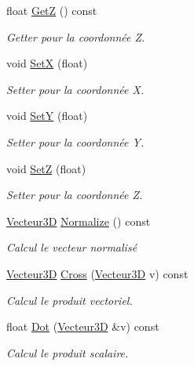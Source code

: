 \begin{DoxyCompactItemize}
float \hyperlink{class_vecteur3_d_a001bd37a2d98c071b59d168057735eeb}{Get\+Z} () const 
\begin{DoxyCompactList}\small\item\em Getter pour la coordonnée Z. \end{DoxyCompactList}\item 
void \hyperlink{class_vecteur3_d_a9e987e98ee43903a5281752bd310a764}{Set\+X} (float)
\begin{DoxyCompactList}\small\item\em Setter pour la coordonnée X. \end{DoxyCompactList}\item 
void \hyperlink{class_vecteur3_d_aaef5dfb35864a47ac7eb986cead20c71}{Set\+Y} (float)
\begin{DoxyCompactList}\small\item\em Setter pour la coordonnée Y. \end{DoxyCompactList}\item 
void \hyperlink{class_vecteur3_d_a0b20935a9e30452ea51da98fc8878181}{Set\+Z} (float)
\begin{DoxyCompactList}\small\item\em Setter pour la coordonnée Z. \end{DoxyCompactList}\item 
\hyperlink{class_vecteur3_d}{Vecteur3\+D} \hyperlink{class_vecteur3_d_a3da112b573b37eb696dd17c7f3a4230f}{Normalize} () const 
\begin{DoxyCompactList}\small\item\em Calcul le vecteur normalisé \end{DoxyCompactList}\item 
\hyperlink{class_vecteur3_d}{Vecteur3\+D} \hyperlink{class_vecteur3_d_a7050066f71a250c11b81e58e1466b389}{Cross} (\hyperlink{class_vecteur3_d}{Vecteur3\+D} v) const 
\begin{DoxyCompactList}\small\item\em Calcul le produit vectoriel. \end{DoxyCompactList}\item 
float \hyperlink{class_vecteur3_d_aa428d49b67ee120ae871cec35fd43805}{Dot} (\hyperlink{class_vecteur3_d}{Vecteur3\+D} \&v) const 
\begin{DoxyCompactList}\small\item\em Calcul le produit scalaire. \end{DoxyCompactList}\end{DoxyCompactItemize}



